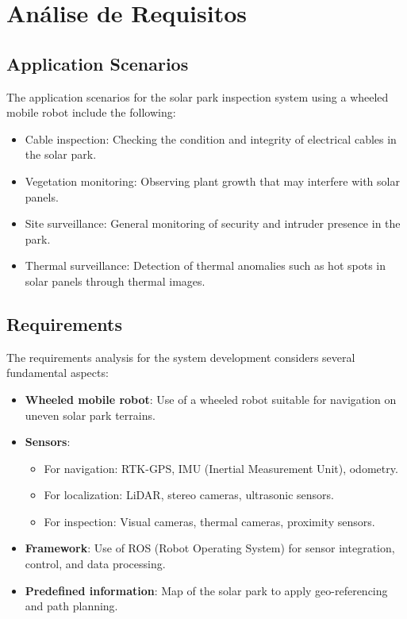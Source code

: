 \chapter{Análise de Requisitos}


\section{Application Scenarios}

The application scenarios for the solar park inspection system using a wheeled mobile robot include the following:

\begin{itemize}
    \item Cable inspection: Checking the condition and integrity of electrical cables in the solar park.
    \item Vegetation monitoring: Observing plant growth that may interfere with solar panels.
    \item Site surveillance: General monitoring of security and intruder presence in the park.
    \item Thermal surveillance: Detection of thermal anomalies such as hot spots in solar panels through thermal images.
\end{itemize}

\section{Requirements}

The requirements analysis for the system development considers several fundamental aspects:

\begin{itemize}
    \item \textbf{Wheeled mobile robot}: Use of a wheeled robot suitable for navigation on uneven solar park terrains.
    \item \textbf{Sensors}: 
        \begin{itemize}
            \item For navigation: RTK-GPS, IMU (Inertial Measurement Unit), odometry.
            \item For localization: LiDAR, stereo cameras, ultrasonic sensors.
            \item For inspection: Visual cameras, thermal cameras, proximity sensors.
        \end{itemize}
    \item \textbf{Framework}: Use of ROS (Robot Operating System) for sensor integration, control, and data processing.
    \item \textbf{Predefined information}: Map of the solar park to apply geo-referencing and path planning.
\end{itemize}